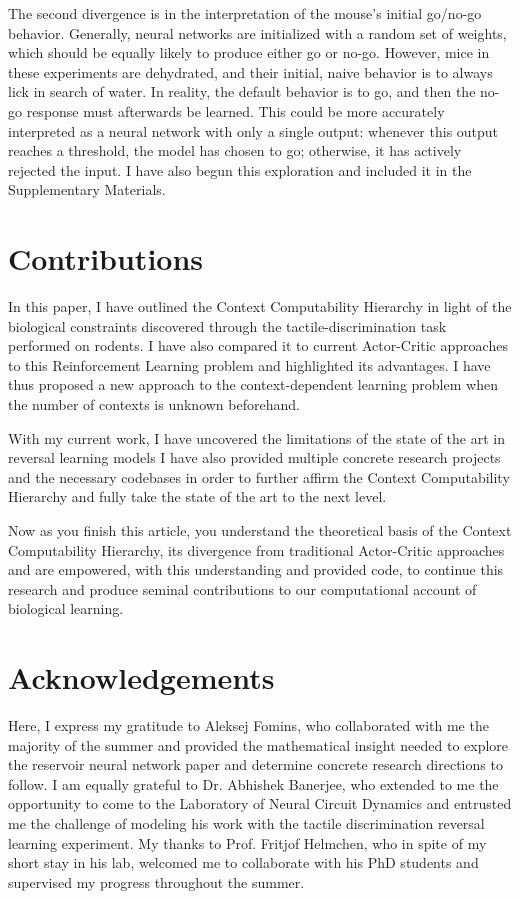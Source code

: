 \documentclass[]{article}
\begin{document}
The second divergence is in the interpretation of the mouse's initial go/no-go behavior.  Generally, neural networks are initialized with a random set of weights, which should be equally likely to produce either go or no-go.  However, mice in these experiments are dehydrated, and their initial, naive behavior is to always lick in search of water.  In reality, the default behavior is to go, and then the no-go response must afterwards be learned.  This could be more accurately interpreted as a neural network with only a single output: whenever this output reaches a threshold, the model has chosen to go; otherwise, it has actively rejected the input.  I have also begun this exploration and included it in the Supplementary Materials.

\section{Contributions}
In this paper, I have outlined the Context Computability Hierarchy in light of the biological constraints discovered through the tactile-discrimination task performed on rodents.  I have also compared it to current Actor-Critic approaches to this Reinforcement Learning problem and highlighted its advantages.  I have thus proposed a new approach to the context-dependent learning problem when the number of contexts is unknown beforehand.

With my current work, I have uncovered the limitations of the state of the art in reversal learning models  I have also provided multiple concrete research projects and the necessary codebases in order to further affirm the Context Computability Hierarchy and fully take the state of the art to the next level.

Now as you finish this article, you understand the theoretical basis of the Context Computability Hierarchy, its divergence from traditional Actor-Critic approaches and are empowered, with this understanding and provided code, to continue this research and produce seminal contributions to our computational account of biological learning.

\newpage
\section{Acknowledgements}

Here, I express my gratitude to Aleksej Fomins, who collaborated with me the majority of the summer and provided the mathematical insight needed to explore the reservoir neural network paper and determine concrete research directions to follow.  I am equally grateful to Dr. Abhishek Banerjee, who extended to me the opportunity to come to the Laboratory of Neural Circuit Dynamics and entrusted me the challenge of modeling his work with the tactile discrimination reversal learning experiment.  My thanks to Prof. Fritjof Helmchen, who in spite of my short stay in his lab, welcomed me to collaborate with his PhD students and supervised my progress throughout the summer.
\end{document}
